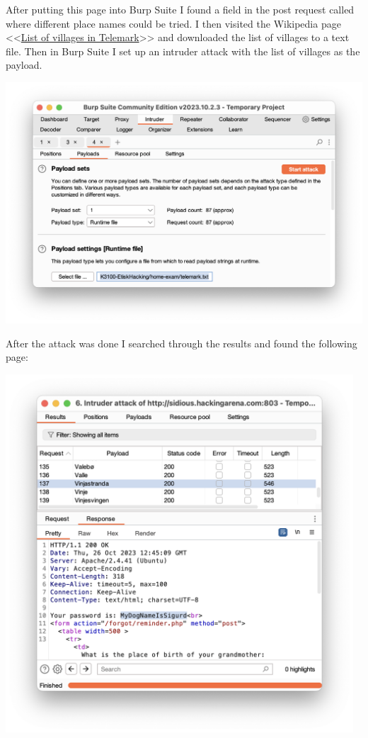 After putting this page into Burp Suite I found a field in the post request called where different place names could be tried.
I then visited the Wikipedia page <<\href{https://en.wikipedia.org/wiki/List_of_villages_in_Telemark}{List of villages in Telemark}>> and downloaded the list of villages to a text file.
Then in Burp Suite I set up an intruder attack with the list of villages as the payload.

\begin{center}
    \includegraphics[width=15cm]{img/Web hacking/Arenabook/Skjermbilde 2023-10-26 kl. 14.54.29.png}
\end{center}

After the attack was done I searched through the results and found the following page:

\begin{center}
    \includegraphics[width=13cm]{img/Web hacking/Arenabook/Skjermbilde 2023-10-26 kl. 14.55.08.png}
\end{center}

